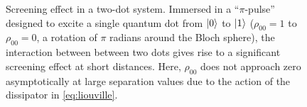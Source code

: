 \documentclass[conference]{IEEEtran}
\begin{document}
\begin{figure}
  \centering
  
  \caption{\label{fig:screening} Screening effect in a two-dot system.
  Immersed in a ``$\pi$-pulse'' designed to excite a single quantum dot from $\ket{0}$ to $\ket{1}$ ($\rho_{00} = 1$ to $\rho_{00} = 0$, a rotation of $\pi$ radians around the Bloch sphere), the interaction between between two dots gives rise to a significant screening effect at short distances.
  Here, $\rho_{00}$ does not approach zero asymptotically at large separation values due to the action of the dissipator in \cref{eq:liouville}.
  }
\end{figure}
\end{document}
